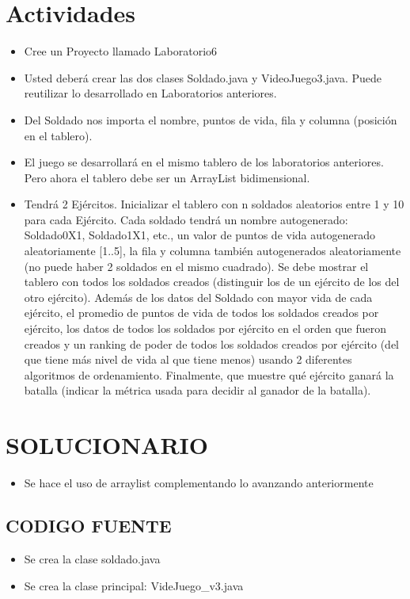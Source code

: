 \documentclass{article}
\begin{document}
	\section{Actividades}
	\begin{itemize}		
		\item Cree un Proyecto llamado Laboratorio6
		\item Usted deberá crear las dos clases Soldado.java y VideoJuego3.java. Puede reutilizar lo
desarrollado en Laboratorios anteriores.
		\item Del Soldado nos importa el nombre, puntos de vida, fila y columna (posición en el tablero).
		
\item El juego se desarrollará en el mismo tablero de los laboratorios anteriores. Pero ahora el
tablero debe ser un ArrayList bidimensional.
\item Tendrá 2 Ejércitos. Inicializar el tablero con n soldados aleatorios entre 1 y 10 para cada
Ejército. Cada soldado tendrá un nombre autogenerado: Soldado0X1, Soldado1X1, etc., un
valor de puntos de vida autogenerado aleatoriamente [1..5], la fila y columna también
autogenerados aleatoriamente (no puede haber 2 soldados en el mismo cuadrado). Se debe
mostrar el tablero con todos los soldados creados (distinguir los de un ejército de los del otro
ejército). Además de los datos del Soldado con mayor vida de cada ejército, el promedio de
puntos de vida de todos los soldados creados por ejército, los datos de todos los soldados por
ejército en el orden que fueron creados y un ranking de poder de todos los soldados creados
por ejército (del que tiene más nivel de vida al que tiene menos) usando 2 diferentes
algoritmos de ordenamiento. Finalmente, que muestre qué ejército ganará la batalla (indicar
la métrica usada para decidir al ganador de la batalla).

	
	\end{itemize}
		
	\section{SOLUCIONARIO}
	\begin{itemize}
		\item Se hace el uso de arraylist  complementando lo avanzando anteriormente
	\end{itemize}

	\subsection{CODIGO FUENTE}
	\begin{itemize}	
		\item Se crea la clase soldado.java
		\item Se crea la clase principal:   VideJuego_v3.java
	\end{itemize}	
		
\end{document}
